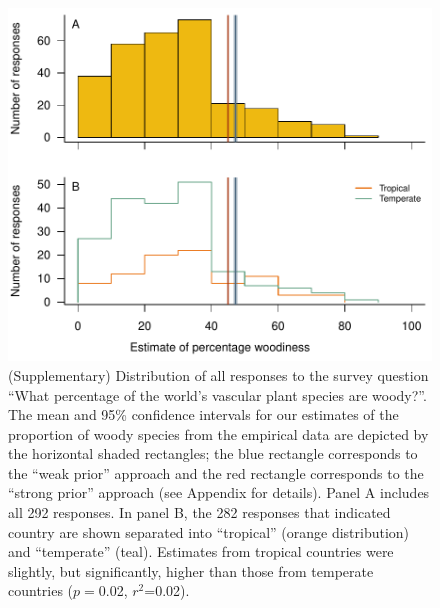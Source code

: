 \documentclass[a4paper,12pt]{article}
\begin{document}
      
\begin{figure}[p]
  \centering
  \includegraphics{figs/survey-distribution}
  \caption{(Supplementary) Distribution of all responses to the survey
    question ``What percentage of the world's vascular plant species
    are woody?''.
    The mean and 95\% confidence intervals for our estimates of the
    proportion of woody species from the empirical data are depicted
    by the horizontal shaded rectangles; the blue rectangle
    corresponds to the ``weak prior'' approach and the red rectangle
    corresponds to the ``strong prior'' approach (see Appendix for
    details).  
    Panel A includes all 292 responses.  In panel B, the 282
    responses that indicated country are shown separated into
    ``tropical'' (orange distribution) and ``temperate'' (teal).
    Estimates from tropical countries were slightly, but
    significantly, higher than those from temperate countries
    ($p=$0.02, $r^2$=0.02).
  }

  \label{fig:survey-distribution}
\end{figure}
\end{document}

